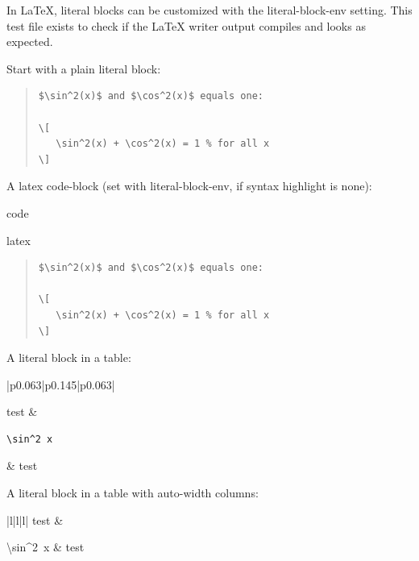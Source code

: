 \documentclass[a4paper]{article}
\newlength{\DUtablewidth} %
\newlength{\ttemwidth}
\begin{document}
In LaTeX, literal blocks can be customized with the \textquotedbl{}literal-block-env\textquotedbl{}
setting. This test file exists to check if the LaTeX writer output compiles
and looks as expected.

Start with a plain literal block:

\begin{quote}
\begin{Verbatim}
$\sin^2(x)$ and $\cos^2(x)$ equals one:

\[
   \sin^2(x) + \cos^2(x) = 1 % for all x
\]
\end{Verbatim}
\end{quote}

A latex \textquotedbl{}code-block\textquotedbl{} (set with \textquotedbl{}literal-block-env\textquotedbl{}, if syntax
highlight is \textquotedbl{}none\textquotedbl{}):

\begin{DUclass}{code}
\begin{DUclass}{latex}
\begin{quote}
\begin{Verbatim}
$\sin^2(x)$ and $\cos^2(x)$ equals one:

\[
   \sin^2(x) + \cos^2(x) = 1 % for all x
\]
\end{Verbatim}
\end{quote}
\end{DUclass}
\end{DUclass}

A literal block in a table:

\setlength{\DUtablewidth}{\linewidth}%
\begin{longtable*}{|p{0.063\DUtablewidth}|p{0.145\DUtablewidth}|p{0.063\DUtablewidth}|}
\hline

test
 & 
\begin{minipage}{8\ttemwidth}
\begin{Verbatim}
\sin^2 x
\end{Verbatim}
\end{minipage}
 & 
test
 \\
\hline
\end{longtable*}

A literal block in a table with auto-width columns:

\begin{longtable*}{|l|l|l|}
\hline
test & 
\ttfamily\raggedright
\textbackslash{}sin\textasciicircum{}2~x
 & test \\
\hline
\end{longtable*}
\end{document}

